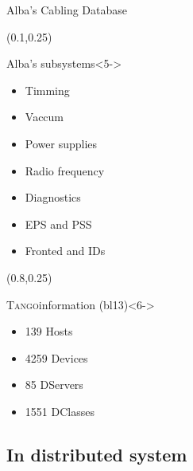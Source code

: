\documentclass{beamer}
\newcommand{\tango}{\textsc{Tango}}
\begin{document}
\begin{frame}
\begin{textblock*}{100mm}
\begin{block}{Alba's Cabling Database}
        \end{block}
    \end{textblock*}
    \begin{textblock*}{35mm}(0.1\textwidth,0.25\textheight)
        \begin{block}{Alba's subsystems}<5->
            \begin{itemize}
                \item Timming %
                \item Vaccum %
                \item Power supplies %
                \item Radio frequency %
                \item Diagnostics %
                \item EPS and PSS
                \item Fronted and IDs
            \end{itemize}
        \end{block}
    \end{textblock*}
    \begin{textblock*}{35mm}(0.8\textwidth,0.25\textheight)
        \begin{exampleblock}{\tango information (bl13)}<6->
            \begin{itemize}
                \item 139 Hosts
                \item 4259 Devices
                \item 85 DServers
                \item 1551 DClasses
            \end{itemize}
        \end{exampleblock}
    \end{textblock*}
\end{frame}

\subsection{In distributed system}
\end{document}
